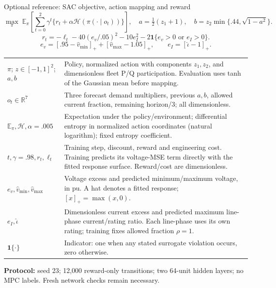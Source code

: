 \begin{frame}[t]{Optional reference: SAC objective, action mapping and reward}
\setlength{\abovedisplayskip}{0pt}\setlength{\belowdisplayskip}{1pt}\setlength{\abovedisplayshortskip}{0pt}\setlength{\belowdisplayshortskip}{1pt}
\[
\max_\pi\;\mathbb E_\pi\!\left[\sum_{t=0}^{2}\gamma^t\{r_t+\alpha\mathcal H(\pi(\cdot\mid o_t))\}\right],\quad
a=\tfrac12(z_1+1),\quad b=z_2\min\{.44,\sqrt{1-a^2}\}.
\]
\[
r_t=-\ell_t-40(e_v/.05)^2-10e_I^2-2\mathbf1\{e_v>0\text{ or }e_I>0\}.
\]
\[
e_v=[.95-\hat v_{\min}]_++[\hat v_{\max}-1.05]_+,\qquad e_I=[\hat\iota-1]_+.
\]
\begin{tabular}{@{}>{\raggedright\arraybackslash}p{.24\linewidth}>{\raggedright\arraybackslash}p{.69\linewidth}@{}}
$\pi$; $z\in[-1,1]^2$; $a,b$ & Policy, normalized action with components $z_1,z_2$, and dimensionless fleet P/Q participation. Evaluation uses tanh of the Gaussian mean before mapping. \\
$o_t\in\mathbb R^7$ & Three forecast demand multipliers, previous $a,b$, allowed current fraction, remaining horizon/3; all dimensionless. \\
$\mathbb E_\pi,\mathcal H,\alpha=.005$ & Expectation under the policy/environment; differential entropy in normalized action coordinates (natural logarithm); fixed entropy coefficient. \\
$t,\gamma=.98,r_t,\ell_t$ & Training step, discount, reward and engineering cost. Training predicts its voltage-MSE term directly with the fitted response surface. Reward/cost are dimensionless. \\
$e_v,\hat v_{\min},\hat v_{\max}$ & Voltage excess and predicted minimum/maximum voltage, in pu. A hat denotes a fitted response; $[x]_+=\max(x,0)$. \\
$e_I,\hat\iota$ & Dimensionless current excess and predicted maximum line-phase current/rating ratio. Each line-phase uses its own rating; training fixes allowed fraction $\rho=1$. \\
$\mathbf1\{\cdot\}$ & Indicator: one when any stated surrogate violation occurs, zero otherwise. \\
\end{tabular}
\par\textbf{Protocol:} seed 23; 12,000 reward-only transitions; two 64-unit hidden layers; no MPC labels. Fresh network checks remain necessary.
\end{frame}

